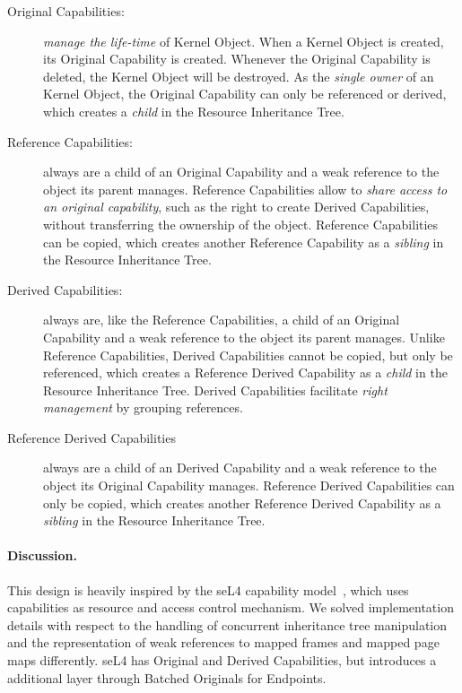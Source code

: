 \begin{description}
\item[Original Capabilities:] \emph{manage the life-time} of Kernel Object. When a Kernel Object is created, its Original Capability is created. Whenever the Original Capability is deleted, the Kernel Object will be destroyed. As the \emph{single owner} of an Kernel Object, the Original Capability can only be referenced or derived, which creates a \emph{child} in the Resource Inheritance Tree.

\item[Reference Capabilities:]
 always are a child of an Original Capability and a weak reference to the object its parent manages. Reference Capabilities allow to \emph{share access to an original capability}, such as the right to create Derived Capabilities, without transferring the ownership of the object. Reference Capabilities can be copied, which creates another Reference Capability as a \emph{sibling} in the Resource Inheritance Tree.

\item[Derived Capabilities:] always are, like the Reference Capabilities, a child of an Original Capability and a weak reference to the object its parent manages. Unlike Reference Capabilities, Derived Capabilities cannot be copied, but only be referenced, which creates a Reference Derived Capability as a \emph{child} in the Resource Inheritance Tree. Derived Capabilities facilitate \emph{right management} by grouping references.

\item[Reference Derived Capabilities] always are a child of an Derived Capability and a weak reference to the object its Original Capability manages. Reference Derived Capabilities can only be copied, which creates another Reference Derived Capability as a \emph{sibling} in the Resource Inheritance Tree.

\end{description}

\paragraph{Discussion.}
This design is heavily inspired by the seL4 capability model~\cite{Heiser:2016:LML:2912578.2893177, GrosvenorWalker2016}, which uses capabilities as resource and access control mechanism. We solved implementation details with respect to the handling of concurrent inheritance tree manipulation and the representation of weak references to mapped frames and mapped page maps differently.
%
seL4 has Original and Derived Capabilities, but introduces a additional layer through Batched Originals for Endpoints.

